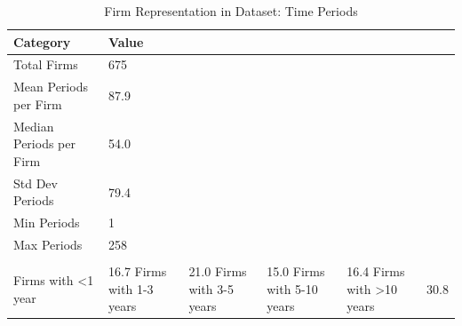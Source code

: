 \begin{table}[ht]
\centering
\caption{Firm Representation in Dataset: Time Periods} 
\label{tab:firm_representation}
\begin{tabular}{ll}
  \hline
Category & Value \\ 
  \hline
Total Firms & 675 \\ 
  Mean Periods per Firm & 87.9 \\ 
  Median Periods per Firm & 54.0 \\ 
  Std Dev Periods & 79.4 \\ 
  Min Periods & 1 \\ 
  Max Periods & 258 \\ 
   &  \\ 
  Firms with <1 year & 16.7%
  Firms with 1-3 years & 21.0%
  Firms with 3-5 years & 15.0%
  Firms with 5-10 years & 16.4%
  Firms with >10 years & 30.8%
   \hline
\end{tabular}
\end{table}
